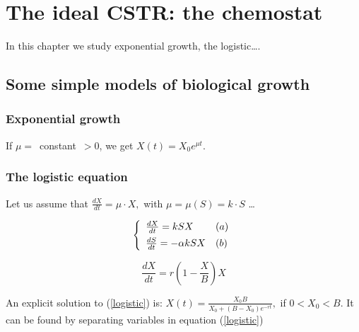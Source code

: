 \documentclass[a4paper, 10pt, twoside, openright]{book}
\begin{document}
\fi




\chapter{The ideal CSTR: the chemostat}

\textsf{%
In this chapter we study exponential growth, the logistic\ldots .}

\section{Some simple models of biological growth}

\subsection{Exponential growth}

If \mbox{$\mu =$ constant $>0$,} we get $X(t)={X}_0
{e}^{\mu t}$.

\subsection{The logistic equation}

Let us assume that $\frac{dX}{dt}=\mu \cdot X,$ with
$\mu=\mu(S)=k\cdot S$ \ldots 

\begin{displaymath}
\left\{ \begin{array}{ll}
\frac{dX}{dt}=kSX                            & (a) \\
\frac{dS}{dt}=- \alpha kSX \rule{0pt}{3ex}   & (b) 
\end{array}\right.
\end{displaymath}

\begin{equation} \label{logistic}
\frac{dX}{dt}= r(1- \frac{X}{B})X  
\end{equation}

An explicit solution to (\ref{logistic}) is: 
$X(t)=\frac{{X}_{0}B}{{X}_{0}+(B-{X}_{0}){e}^{-rt}},$ if $0<{X}_{0}<B$. 
It can be found by separating variables in equation (\ref{logistic})
\end{document}
